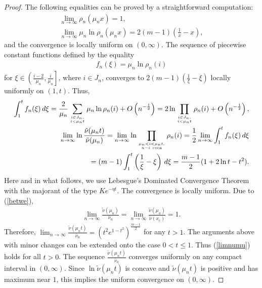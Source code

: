 \documentclass[10pt]{amsart}
\theoremstyle{remark}
\let\td=\tilde
\begin{document}
\begin{proof}
The following equalities can be proved by a straightforward
computation:
\begin{eqnarray}
\lim_{n\to\infty}\rho_n(\mu_nx)=1,\label{limrmux}\\
\lim_{n\to\infty} \mu_n\ln\rho_n(\mu_n
x)=2(m-1)\left(\frac1x-x\right),\nonumber
\end{eqnarray}
and the convergence is locally uniform on $(0,\infty)$. The
sequence of piecewise constant functions defined by the equality
\begin{eqnarray}\label{deffn}
f_n(\xi)=\mu_n\ln\rho_n(i)
\end{eqnarray}
for $\xi\in\left(\frac{i-2}{\mu_n},\frac{i}{\mu_n}\right]$, where
$i\in J_n$, converges to $2(m-1)\left(\frac1\xi-\xi\right)$
locally uniformly on $(1,t)$.  Thus,
\begin{eqnarray*}
\int_1^tf_n(\xi)\,d\xi=\frac2{\mu_n}\sum_{i\in J_n,\atop i<\mu_n
t}
\mu_n\ln\rho_n(i)+O\left(n^{-\frac12}\right)= 2\ln \prod_{i\in
J_n,\atop i<\mu_n t}\rho_n(i)+O\left(n^{-\frac12}\right),\\
\lim_{n\to\infty}\ln\frac{\td\nu(\mu_nt)}{\td\nu(\mu_n)}
=\lim_{n\to\infty}\ln \prod_{\mu_n<i<\mu_nt,\atop
n-i~\mbox{\rm\tiny even}}\rho_n(i)
=\frac12\lim_{n\to\infty}\int_1^tf_n(\xi)\,d\xi
\\
=(m-1)\int_1^t\left(\frac1\xi-\xi\right)\,d\xi=\frac{m-1}2(1+2\ln
t-t^2).
\end{eqnarray*}
Here and in what follows, we use Lebesgue's Dominated Convergence
Theorem with the majorant of the type $Ke^{-\eta t}$. The
convergence is locally uniform. Due to (\ref{betwe}),
\begin{eqnarray}\label{barmunu}
\lim_{n\to\infty}\frac{\td\nu(\mu_n)}{\bar\nu_n}
=\lim_{n\to\infty}\frac{\td\nu(\mu_n)}{\td\nu(x_c)}=1.
\end{eqnarray}
Therefore, $\lim_{n\to\infty}\frac{\td\nu(\mu_nt)}{\bar\nu_n}
=\left(t^2e^{1-t^2}\right)^{\frac{m-1}{2}}$ for any $t>1$. The
arguments above with minor changes can be extended onto the case
$0<t\leq1$. Thus (\ref{limnumu}) holds for all $t>0$.  The
sequence $\frac{\td\nu(\mu_nt)}{\bar\nu_n}$ converges uniformly on
any compact interval in $(0,\infty)$. Since $\ln\td\nu(\mu_nt)$ is
concave and $\td\nu(\mu_nt)$ is positive and has maximum near $1$,
this implies the uniform convergence on $(0,\infty)$.


\end{proof}
\end{document}
